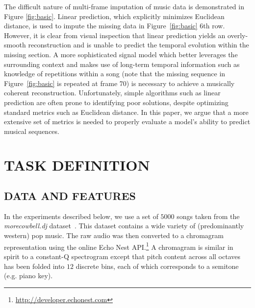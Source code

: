 \documentclass{article}
\begin{document}
The difficult nature of multi-frame imputation of music data is
demonstrated in Figure \ref{fig:basic}.
Linear prediction, which
explicitly minimizes Euclidean distance, is used to impute the missing
data in Figure~\ref{fig:basic} $6$th row.  However, it is clear from
visual inspection that linear prediction yields an overly-smooth
reconstruction and is unable to predict the temporal evolution within
the missing section.
%
A more sophisticated signal model which better leverages the
surrounding context and makes use of long-term temporal information
such as knowledge of repetitions within a song (note that the missing
sequence in Figure~\ref{fig:basic} is repeated at frame 70) is
necessary to achieve a musically coherent reconstruction.
%
Unfortunately, simple algorithms such as linear prediction are often
prone to identifying poor solutions, despite optimizing standard
metrics such as Euclidean distance.
%
In this paper, we argue that a more extensive set of metrics is needed
to properly evaluate a model's ability to predict musical sequences.


\section{TASK DEFINITION}
\label{sec:task}

\subsection{DATA AND FEATURES}
\label{ssec:feats}
In the experiments described below, we use a set of $5000$ songs taken
from the \emph{morecowbell.dj} dataset~\cite{Bertin-Mahieux2010a}.
This dataset contains a wide variety of (predominantly western) pop
music.  The raw audio was then converted to a chromagram
representation using the online Echo Nest
API.\footnote{\url{http://developer.echonest.com}} A chromagram is
similar in spirit to a constant-Q spectrogram except that pitch
content across all octaves has been folded into $12$ discrete bins,
each of which corresponds to a semitone (e.g. piano key).
%
\end{document}
